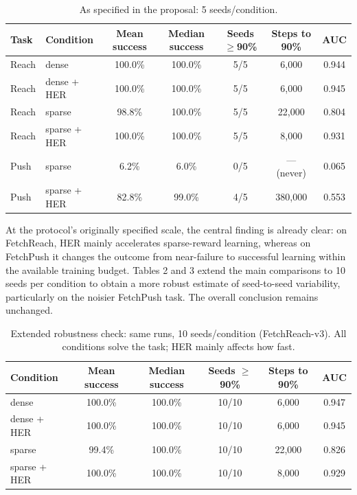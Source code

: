 \documentclass{article}
\begin{document}
\begin{table}[H]
\centering
\caption{As specified in the proposal: 5 seeds/condition.}
\label{tab:spec5}
\footnotesize
\begin{tabular}{llccccc}
\toprule
Task & Condition & Mean success & Median success & Seeds $\geq$90\% & Steps to 90\% & AUC \\
\midrule
Reach & dense       & 100.0\% & 100.0\% & 5/5 & 6{,}000  & 0.944 \\
Reach & dense + HER & 100.0\% & 100.0\% & 5/5 & 6{,}000  & 0.945 \\
Reach & sparse      & 98.8\%  & 100.0\% & 5/5 & 22{,}000 & 0.804 \\
Reach & sparse + HER& 100.0\% & 100.0\% & 5/5 & 8{,}000  & 0.931 \\
Push  & sparse       & 6.2\%  & 6.0\%  & 0/5 & --- (never) & 0.065 \\
Push  & sparse + HER & 82.8\% & 99.0\% & 4/5 & 380{,}000   & 0.553 \\
\bottomrule
\end{tabular}
\end{table}

At the protocol's originally specified scale, the central finding is already clear: on FetchReach, HER mainly accelerates sparse-reward learning, whereas on FetchPush it changes the outcome from near-failure to successful learning within the available training budget. Tables 2 and 3 extend the main comparisons to 10 seeds per condition to obtain a more robust estimate of seed-to-seed variability, particularly on the noisier FetchPush task. The overall conclusion remains unchanged.

\begin{table}[H]
\centering
\caption{Extended robustness check: same runs, 10 seeds/condition
(FetchReach-v3). All conditions solve the task; HER mainly affects how
fast.}
\label{tab:reach}
\footnotesize
\begin{tabular}{lccccc}
\toprule
Condition & Mean success & Median success & Seeds $\geq$90\% & Steps to 90\% & AUC \\
\midrule
dense       & 100.0\% & 100.0\% & 10/10 & 6{,}000  & 0.947 \\
dense + HER & 100.0\% & 100.0\% & 10/10 & 6{,}000  & 0.945 \\
sparse      & 99.4\%  & 100.0\% & 10/10 & 22{,}000 & 0.826 \\
sparse + HER& 100.0\% & 100.0\% & 10/10 & 8{,}000  & 0.929 \\
\bottomrule
\end{tabular}
\end{table}
\end{document}
